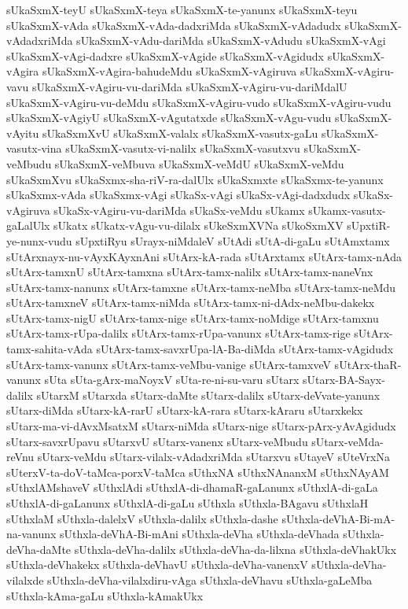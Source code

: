{sUkaSxmX-teyU
sUkaSxmX-teya
sUkaSxmX-te-yanunx
sUkaSxmX-teyu
sUkaSxmX-vAda
sUkaSxmX-vAda-dadxriMda
sUkaSxmX-vAdadudx
sUkaSxmX-vAdadxriMda
sUkaSxmX-vAdu-dariMda
sUkaSxmX-vAdudu
sUkaSxmX-vAgi
sUkaSxmX-vAgi-dadxre
sUkaSxmX-vAgide
sUkaSxmX-vAgidudx
sUkaSxmX-vAgira
sUkaSxmX-vAgira-bahudeMdu
sUkaSxmX-vAgiruva
sUkaSxmX-vAgiru-vavu
sUkaSxmX-vAgiru-vu-dariMda
sUkaSxmX-vAgiru-vu-dariMdalU
sUkaSxmX-vAgiru-vu-deMdu
sUkaSxmX-vAgiru-vudo
sUkaSxmX-vAgiru-vudu
sUkaSxmX-vAgiyU
sUkaSxmX-vAgutatxde
sUkaSxmX-vAgu-vudu
sUkaSxmX-vAyitu
sUkaSxmXvU
sUkaSxmX-valalx
sUkaSxmX-vasutx-gaLu
sUkaSxmX-vasutx-vina
sUkaSxmX-vasutx-vi-nalilx
sUkaSxmX-vasutxvu
sUkaSxmX-veMbudu
sUkaSxmX-veMbuva
sUkaSxmX-veMdU
sUkaSxmX-veMdu
sUkaSxmXvu
sUkaSxmx-sha-riV-ra-dalUlx
sUkaSxmxte
sUkaSxmx-te-yanunx
sUkaSxmx-vAda
sUkaSxmx-vAgi
sUkaSx-vAgi
sUkaSx-vAgi-dadxdudx
sUkaSx-vAgiruva
sUkaSx-vAgiru-vu-dariMda
sUkaSx-veMdu
sUkamx
sUkamx-vasutx-gaLalUlx
sUkatx
sUkatx-vAgu-vu-dilalx
sUkeSxmXVNa
sUkoSxmXV
sUpxtiR-ye-nunx-vudu
sUpxtiRyu
sUrayx-niMdaleV
sUtAdi
sUtA-di-gaLu
sUtAmxtamx
sUtArxnayx-nu-vAyxKAyxnAni
sUtArx-kA-rada
sUtArxtamx
sUtArx-tamx-nAda
sUtArx-tamxnU
sUtArx-tamxna
sUtArx-tamx-nalilx
sUtArx-tamx-naneVnx
sUtArx-tamx-nanunx
sUtArx-tamxne
sUtArx-tamx-neMba
sUtArx-tamx-neMdu
sUtArx-tamxneV
sUtArx-tamx-niMda
sUtArx-tamx-ni-dAdx-neMbu-dakekx
sUtArx-tamx-nigU
sUtArx-tamx-nige
sUtArx-tamx-noMdige
sUtArx-tamxnu
sUtArx-tamx-rUpa-dalilx
sUtArx-tamx-rUpa-vanunx
sUtArx-tamx-rige
sUtArx-tamx-sahita-vAda
sUtArx-tamx-savxrUpa-lA-Ba-diMda
sUtArx-tamx-vAgidudx
sUtArx-tamx-vanunx
sUtArx-tamx-veMbu-vanige
sUtArx-tamxveV
sUtArx-thaR-vanunx
sUta
sUta-gArx-maNoyxV
sUta-re-ni-su-varu
sUtarx
sUtarx-BA-Sayx-dalilx
sUtarxM
sUtarxda
sUtarx-daMte
sUtarx-dalilx
sUtarx-deVvate-yanunx
sUtarx-diMda
sUtarx-kA-rarU
sUtarx-kA-rara
sUtarx-kAraru
sUtarxkekx
sUtarx-ma-vi-dAvxMsatxM
sUtarx-niMda
sUtarx-nige
sUtarx-pArx-yAvAgidudx
sUtarx-savxrUpavu
sUtarxvU
sUtarx-vanenx
sUtarx-veMbudu
sUtarx-veMda-reVnu
sUtarx-veMdu
sUtarx-vilalx-vAdadxriMda
sUtarxvu
sUtayeV
sUteVrxNa
sUterxV-ta-doV-taMca-porxV-taMca
sUthxNA
sUthxNAnanxM
sUthxNAyAM
sUthxlAMshaveV
sUthxlAdi
sUthxlA-di-dhamaR-gaLanunx
sUthxlA-di-gaLa
sUthxlA-di-gaLanunx
sUthxlA-di-gaLu
sUthxla
sUthxla-BAgavu
sUthxlaH
sUthxlaM
sUthxla-dalelxV
sUthxla-dalilx
sUthxla-dashe
sUthxla-deVhA-Bi-mA-na-vanunx
sUthxla-deVhA-Bi-mAni
sUthxla-deVha
sUthxla-deVhada
sUthxla-deVha-daMte
sUthxla-deVha-dalilx
sUthxla-deVha-da-lilxna
sUthxla-deVhakUkx
sUthxla-deVhakekx
sUthxla-deVhavU
sUthxla-deVha-vanenxV
sUthxla-deVha-vilalxde
sUthxla-deVha-vilalxdiru-vAga
sUthxla-deVhavu
sUthxla-gaLeMba
sUthxla-kAma-gaLu
sUthxla-kAmakUkx
}
